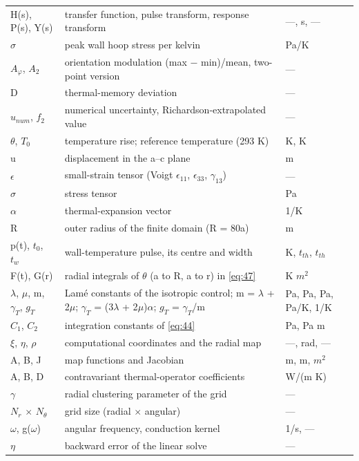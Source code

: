 \documentclass[preprint,12pt]{elsarticle}
\begin{document}
\begin{table}[htbp]
\begin{tabularx}{\textwidth}{lXl}
H(s), P(s), Y(s) & transfer function, pulse transform, response transform & ---, s, --- \\
$\hat{\sigma}$ & peak wall hoop stress per kelvin & Pa/K \\
$A_{\varphi}$, $A_{2}$ & orientation modulation (max $-$ min)/mean, two-point version & --- \\
D & thermal-memory deviation & --- \\
$u_{num}$, $f_{2}$ & numerical uncertainty, Richardson-extrapolated value & --- \\
$\theta$, $T_{0}$ & temperature rise; reference temperature (293 K) & K, K \\
u & displacement in the a--c plane & m \\
$\epsilon$ & small-strain tensor (Voigt $\epsilon_{11}$, $\epsilon_{33}$, $\gamma_{13}$) & --- \\
$\sigma$ & stress tensor & Pa \\
$\alpha$ & thermal-expansion vector & 1/K \\
R & outer radius of the finite domain (R = 80a) & m \\
p(t), $t_{0}$, $t_{w}$ & wall-temperature pulse, its centre and width & K, $t_{th}$, $t_{th}$ \\
F(t), G(r) & radial integrals of $\theta$ (a to R, a to r) in \eqref{eq:47} & K $m^{2}$ \\
$\lambda$, $\mu$, m, $\gamma_{T}$, $g_{T}$ & Lam\'e constants of the isotropic control; m = $\lambda$ + 2$\mu$; $\gamma_{T}$ = (3$\lambda$ + 2$\mu$)$\alpha$; $g_{T}$ = $\gamma_{T}$/m & Pa, Pa, Pa, Pa/K, 1/K \\
$C_{1}$, $C_{2}$ & integration constants of \eqref{eq:44} & Pa, Pa m \\
$\xi$, $\eta$, $\rho$ & computational coordinates and the radial map & ---, rad, --- \\
A, B, J & map functions and Jacobian & m, m, $m^{2}$ \\
A, B, D & contravariant thermal-operator coefficients & W/(m K) \\
$\gamma$ & radial clustering parameter of the grid & --- \\
$N_{r}$ $\times$ $N_{\theta}$ & grid size (radial $\times$ angular) & --- \\
$\omega$, g($\omega$) & angular frequency, conduction kernel & 1/s, --- \\
$\eta$ & backward error of the linear solve & --- \\
\bottomrule
\end{tabularx}
\end{table}


\end{document}

